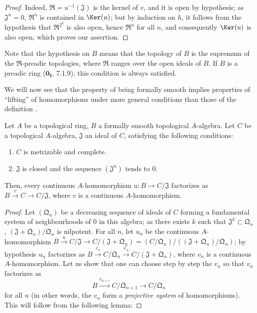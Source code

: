 \begin{proof}
Indeed, $\mathfrak{R}=u^{-1}(\mathfrak{J})$ is the kernel of $v$, and it is open by hypothesis;
as $\mathfrak{J}^n=0$, $\mathfrak{R}^n$ is contained in $\Ker(u)$;
but by induction on $h$, it follows from the hypothesis that $\mathfrak{R}^{2^h}$ is also open, hence $\mathfrak{R}^n$ for all $n$, and consequently $\Ker(u)$ is also open, which proves our assertion.
\end{proof}

Note that the hypothesis on $B$ means that the topology of $B$ is the
supremum of the $\mathfrak{R}$-preadic topologies, where $\mathfrak{R}$ ranges
over the open ideals of $B$. If $B$ is a preadic ring ($\mathbf{0_I}$, 7.1.9),
this condition is always satisfied.

\begin{env}[19.3.9]
\label{0.19.3.9}
We will now see that the property of being formally smooth implies properties of ``lifting'' of homomorphisms under more general conditions than those of the definition .
\end{env}


\begin{proposition}[19.3.10]
\label{0.19.3.10}
Let $A$ be a topological ring, $B$ a formally smooth topological $A$-algebra.
Let $C$ be a topological $A$-algebra, $\mathfrak{J}$ an ideal of $C$, satisfying the following conditions:
\begin{enumerate}
  \item[$1^\circ$] $C$ is metrizable and complete.
  \item[$2^\circ$] $\mathfrak{J}$ is closed and the sequence $(\mathfrak{J}^n)$ tends to $0$.
\end{enumerate}
Then, every continuous $A$-homomorphism $u:B\to C/\mathfrak{J}$ factorizes as $B\xrightarrow{v}C\to C/\mathfrak{J}$, where $v$ is a continuous $A$-homomorphism.
\end{proposition}

\begin{proof}
Let $(\mathfrak{Q}_n)$ be a decreasing sequence of ideals of $C$ forming a fundamental system of neighbourhoods of $0$ in this algebra;
as there exists $k$ such that $\mathfrak{J}^k\subset\mathfrak{Q}_n$, $(\mathfrak{J}+\mathfrak{Q}_n)/\mathfrak{Q}_n$ is nilpotent.
For all $n$, let $u_n$ be the continuous $A$-homomorphism $B\xrightarrow{u}C/\mathfrak{J}\to C/(\mathfrak{J}+\mathfrak{Q}_n)=(C/\mathfrak{Q}_n)/((\mathfrak{J}+\mathfrak{Q}_n)/\mathfrak{Q}_n)$;
by hypothesis $u_n$ factorizes as $B\xrightarrow{v_n}C/\mathfrak{Q}_n\xrightarrow{\varphi_n}C/(\mathfrak{J}+\mathfrak{Q}_n)$, where $v_n$ is a continuous $A$-homomorphism.
Let us show that one can choose step by step the $v_n$ so that $v_n$ factorizes as
\[
  B\xrightarrow{v_{n+1}}C/\mathfrak{Q}_{n+1}\to C/\mathfrak{Q}_n
\]
for all $n$ (in other words, the $v_n$ form a \emph{projective system} of homomorphisms).
This will follow from the following lemma:
\end{proof}

